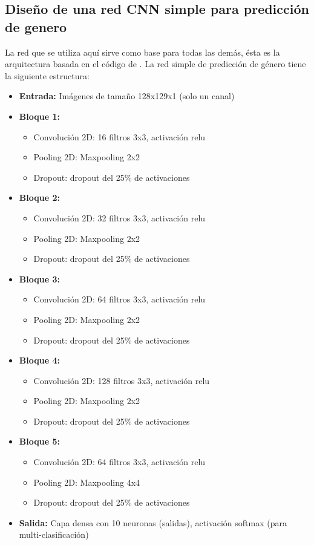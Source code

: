 \subsection{Diseño de una red CNN simple para predicción de genero}\label{sec:arquitectura_simple}
\noindent La red que se utiliza aquí sirve como base para todas las demás, ésta es la arquitectura basada en el código de \cite{hguimares:gtzankeras}. La red simple de predicción de género tiene la siguiente estructura:
\begin{itemize}
\item \textbf{Entrada:} Imágenes de tamaño 128x129x1 (solo un canal)
\item \textbf{Bloque 1:}
\begin{itemize}
\item Convolución 2D: 16 filtros 3x3, activación relu
\item Pooling 2D: Maxpooling 2x2
\item Dropout: dropout del 25\% de activaciones
\end{itemize} 
\item \textbf{Bloque 2:}
\begin{itemize}
\item Convolución 2D: 32 filtros 3x3, activación relu
\item Pooling 2D: Maxpooling 2x2
\item Dropout: dropout del 25\% de activaciones
\end{itemize} 
\item \textbf{Bloque 3:}
\begin{itemize}
\item Convolución 2D: 64 filtros 3x3, activación relu
\item Pooling 2D: Maxpooling 2x2
\item Dropout: dropout del 25\% de activaciones
\end{itemize} 
\item \textbf{Bloque 4:}
\begin{itemize}
\item Convolución 2D: 128 filtros 3x3, activación relu
\item Pooling 2D: Maxpooling 2x2
\item Dropout: dropout del 25\% de activaciones
\end{itemize} 
\item \textbf{Bloque 5:}
\begin{itemize}
\item Convolución 2D: 64 filtros 3x3, activación relu
\item Pooling 2D: Maxpooling 4x4
\item Dropout: dropout del 25\% de activaciones
\end{itemize} 
\item \textbf{Salida:} Capa densa con 10 neuronas (salidas), activación softmax (para multi-clasificación)
\end{itemize}
        
